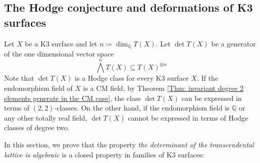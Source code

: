 \documentclass[11pt,twoside,a4paper]{amsart}
\newcommand{\0}{\mathscr{O}}
\newcommand{\Q}{\mathbb{Q}}
\theoremstyle{plain}
\theoremstyle{definition}
\theoremstyle{remark}
\begin{document}
\subsection{The Hodge conjecture and deformations of K3 surfaces}
Let $X$ be a K3 surface and let $n\coloneqq \dim_\Q T(X)$. Let $\det T(X)$ be a generator of the one dimensional vector space
\[
\textstyle
\bigwedge^{n}T(X)\subseteq T(X)^{\otimes n}
\]
Note that $\det T(X)$ is a Hodge class for every K3 surface $X$. 
If the endomorphism field of $X$ is a CM field, by Theorem \ref{Thm: invariant degree 2 elements generate in the CM case}, the class $\det T(X)$ can be expressed in terms of $(2,2)$-classes. On the other hand, if the endomorphism field is $\Q$ or any other totally real field, $\det T(X)$ cannot be expressed in terms of Hodge classes of degree two.

\smallskip

In this section, we prove that the property \textit{the determinant of the transcendental lattice is algebraic} is a closed property in families of K3 surfaces:
\end{document}
